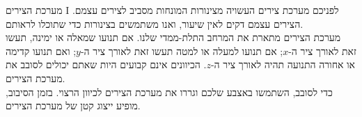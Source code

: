 \begin{surferPage}[Coordinates I]{מערכת הצירים I}
לפניכם מערכת צירים העשויה מצינורות המונחות מסביב לצירים עצמם. הצירים עצמם דקים לאין שיעור, ואנו משתמשים בצינורות כדי שתוכלו לראותם.\\
מערכת הצירים מתארת את המרחב התלת-ממדי שלנו. אם תנועו שמאלה או ימינה, תעשו זאת לאורך ציר ה-$x$; אם תנועו למעלה או למטה תעשו זאת לאורך ציר ה-$y$; ואם תנועו קדימה או אחורה התנועה תהיה לאורך ציר ה-$z$. הכיוונים אינם קבועים היות שאתם יכולים לסובב את מערכת הצירים.\\
\vspace{0,3cm}
כדי לסובב, השתמשו באצבע שלכם וגררו את מערכת הצירים לכיוון הרצוי. בזמן הסיבוב, מופיע ייצוג קטן של מערכת הצירים.
\end{surferPage}
